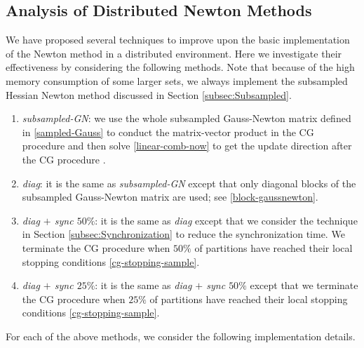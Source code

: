 \documentclass[12pt]{article}
\begin{document}
\subsection{Analysis of Distributed Newton Methods}
\label{subsec:Analysis-newton}
We have proposed several techniques to improve upon the basic implementation of the Newton method in a distributed environment. 
Here we investigate their effectiveness by considering the following methods.
Note that because of the high memory consumption of some larger sets, we always implement
the subsampled Hessian Newton method discussed in Section \ref{subsec:Subsampled}.
\begin{enumerate}[1.]
  \item {\sl subsampled-GN}: we use the whole subsampled Gauss-Newton matrix defined in \eqref{sampled-Gauss} to conduct the matrix-vector product in the CG procedure 
and then solve \eqref{linear-comb-now} to get the update direction after the CG procedure \citep{CCW15a}.
  \item {\sl diag}: it is the same as {\sl subsampled-GN} except that only diagonal blocks of the subsampled Gauss-Newton matrix are used; see \eqref{block-gaussnewton}. 
  \item {\sl diag $+$ sync $50\%$}: it is the same as {\sl diag} except that we consider the technique in Section \ref{subsec:Synchronization} to reduce the synchronization time. 
We terminate the CG procedure when $50\%$ of partitions have reached their local stopping conditions \eqref{cg-stopping-sample}.
  \item {\sl diag $+$ sync $25\%$}: it is the same as {\sl diag $+$ sync $50\%$} except that we terminate the CG procedure when $25\%$ of partitions have reached 
their local stopping conditions \eqref{cg-stopping-sample}.
\end{enumerate}
For each of the above methods, we consider the following implementation details.
\end{document}
